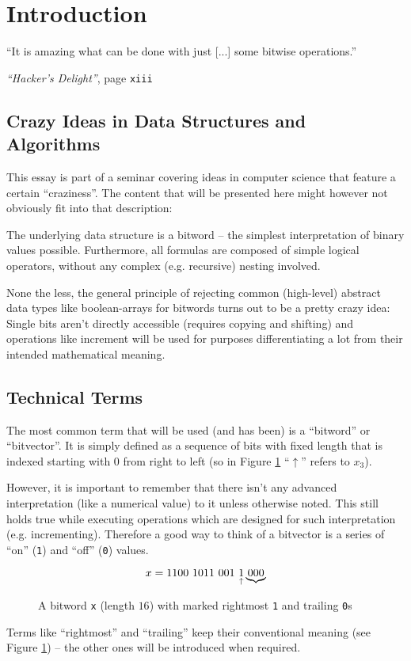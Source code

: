 \section{Introduction}\label{sec:introduction}
\epigraph{
``It is amazing what can be done
with just [...] some bitwise operations.''
}{
\emph{``Hacker's Delight''}, page \texttt{xiii}
\cite{Warren:2012:HD:2462741}
}


\subsection*{Crazy Ideas in Data Structures and Algorithms}
This essay is part of a seminar covering
ideas in computer science that feature a certain ``craziness''.
The content that will be presented here
might however not obviously fit into that description:

The underlying data structure is a bitword
-- the simplest interpretation of binary values possible.
Furthermore, all formulas are composed of simple logical operators,
without any complex (e.g. recursive) nesting involved.

None the less, the general principle of rejecting
common (high-level) abstract data types like boolean-arrays
for bitwords turns out to be a pretty crazy idea:
Single bits aren't directly accessible (requires copying and shifting)
and operations like increment will be used for
purposes differentiating a lot from their intended mathematical meaning.

\subsection*{Technical Terms}
The most common term that will be used (and has been)
is a ``bitword'' or ``bitvector''.
It is simply defined as a sequence of bits with fixed length
that is indexed starting with $0$ from right to left
(so in Figure \ref{fig:bitword} ``$\uparrow$'' refers to $x_3$).

However, it is important to remember that
there isn't any advanced interpretation (like a numerical value) to it
unless otherwise noted.
This still holds true while executing operations
which are designed for such interpretation (e.g. incrementing).
Therefore a good way to think of a bitvector
is a series of ``on'' (\lstinline{1}) and ``off'' (\lstinline{0}) values.

\begin{figure}[h]
\[
x = \lstinline{1100 1011 001 }
\underset{\uparrow}{\lstinline{1}}
\underbrace{\lstinline{000}}
\]
\caption{
A bitword \lstinline{x} (length $16$)
with marked rightmost \lstinline{1} and trailing \lstinline{0}s
}
\label{fig:bitword}
\end{figure}

Terms like ``rightmost'' and ``trailing''
keep their conventional meaning (see Figure \ref{fig:bitword})
-- the other ones will be introduced when required.
